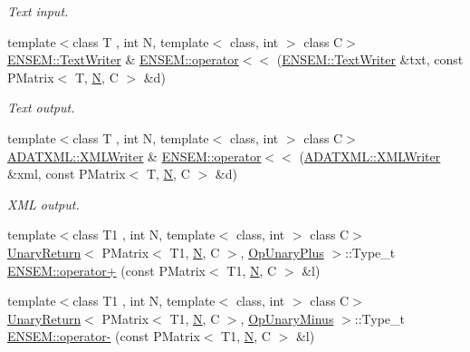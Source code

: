 \begin{DoxyCompactItemize}
\begin{DoxyCompactList}\small\item\em Text input. \end{DoxyCompactList}\item 
{\footnotesize template$<$class T , int N, template$<$ class, int $>$ class C$>$ }\\\mbox{\hyperlink{classENSEM_1_1TextWriter}{E\+N\+S\+E\+M\+::\+Text\+Writer}} \& \mbox{\hyperlink{group__primmatrix_gafa0f739db2eca6b8b80d632ce81f78b7}{E\+N\+S\+E\+M\+::operator$<$$<$}} (\mbox{\hyperlink{classENSEM_1_1TextWriter}{E\+N\+S\+E\+M\+::\+Text\+Writer}} \&txt, const P\+Matrix$<$ T, \mbox{\hyperlink{adat__devel_2lib_2hadron_2operator__name__util_8cc_a7722c8ecbb62d99aee7ce68b1752f337}{N}}, C $>$ \&d)
\begin{DoxyCompactList}\small\item\em Text output. \end{DoxyCompactList}\item 
{\footnotesize template$<$class T , int N, template$<$ class, int $>$ class C$>$ }\\\mbox{\hyperlink{classADATXML_1_1XMLWriter}{A\+D\+A\+T\+X\+M\+L\+::\+X\+M\+L\+Writer}} \& \mbox{\hyperlink{group__primmatrix_ga88162a3095bbb5b40ba8100093befe2b}{E\+N\+S\+E\+M\+::operator$<$$<$}} (\mbox{\hyperlink{classADATXML_1_1XMLWriter}{A\+D\+A\+T\+X\+M\+L\+::\+X\+M\+L\+Writer}} \&xml, const P\+Matrix$<$ T, \mbox{\hyperlink{adat__devel_2lib_2hadron_2operator__name__util_8cc_a7722c8ecbb62d99aee7ce68b1752f337}{N}}, C $>$ \&d)
\begin{DoxyCompactList}\small\item\em X\+ML output. \end{DoxyCompactList}\item 
{\footnotesize template$<$class T1 , int N, template$<$ class, int $>$ class C$>$ }\\\mbox{\hyperlink{structUnaryReturn}{Unary\+Return}}$<$ P\+Matrix$<$ T1, \mbox{\hyperlink{adat__devel_2lib_2hadron_2operator__name__util_8cc_a7722c8ecbb62d99aee7ce68b1752f337}{N}}, C $>$, \mbox{\hyperlink{structOpUnaryPlus}{Op\+Unary\+Plus}} $>$\+::Type\+\_\+t \mbox{\hyperlink{group__primmatrix_ga0034bb2111966a353c20e6d171273d4e}{E\+N\+S\+E\+M\+::operator+}} (const P\+Matrix$<$ T1, \mbox{\hyperlink{adat__devel_2lib_2hadron_2operator__name__util_8cc_a7722c8ecbb62d99aee7ce68b1752f337}{N}}, C $>$ \&l)
\item 
{\footnotesize template$<$class T1 , int N, template$<$ class, int $>$ class C$>$ }\\\mbox{\hyperlink{structUnaryReturn}{Unary\+Return}}$<$ P\+Matrix$<$ T1, \mbox{\hyperlink{adat__devel_2lib_2hadron_2operator__name__util_8cc_a7722c8ecbb62d99aee7ce68b1752f337}{N}}, C $>$, \mbox{\hyperlink{structOpUnaryMinus}{Op\+Unary\+Minus}} $>$\+::Type\+\_\+t \mbox{\hyperlink{group__primmatrix_ga76960c32943a9f55860945f47f02de5b}{E\+N\+S\+E\+M\+::operator-\/}} (const P\+Matrix$<$ T1, \mbox{\hyperlink{adat__devel_2lib_2hadron_2operator__name__util_8cc_a7722c8ecbb62d99aee7ce68b1752f337}{N}}, C $>$ \&l)

\end{DoxyCompactItemize}
